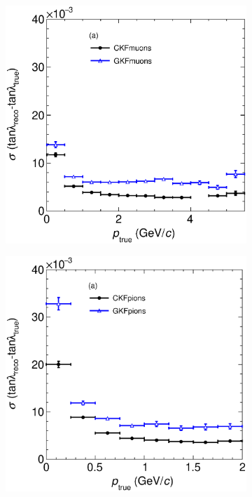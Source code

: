 \begin{figure}[t]
     \centering
     \begin{subfigure}{0.32\textwidth}
         \centering
         \includegraphics[width=\textwidth]{figures/ch5-KF_NDGAr/FullSample/Int/Angle_Res/tanlambda/RestanlambdaVSp_13.eps}
         \caption{}
         \label{fig:tanlambdaResVSp13_Int}
     \end{subfigure}
     \begin{subfigure}{0.32\textwidth}
         \centering
         \includegraphics[width=\textwidth]{figures/ch5-KF_NDGAr/FullSample/Int/Angle_Res/tanlambda/RestanlambdaVSp_211.eps}

\end{subfigure}
\end{figure}
